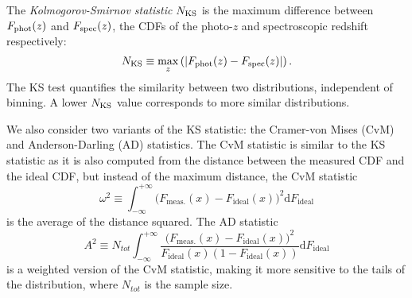 The \textit{Kolmogorov-Smirnov statistic} $N_{\rm KS}$ is the maximum difference between $F_{\rm phot}(z)$ and $F_{\rm spec}(z)$, the CDFs of the photo-$z$ and spectroscopic redshift respectively:
\begin{equation}
N_{\rm KS} \equiv \max_{z}\left( \left| F_{\rm phot}(z) - F_{\rm spec}(z) \right| \right).
\end{equation}
The KS test quantifies the similarity between two distributions, independent of binning.
A lower $N_{\rm KS}$ value corresponds to more similar distributions.

We also consider two variants of the KS statistic: the Cramer-von Mises (CvM) and Anderson-Darling (AD) statistics.
The CvM statistic is similar to the KS statistic as it is also computed from the distance between the measured CDF and the ideal CDF, but instead of the maximum distance, the CvM statistic
\begin{equation}
\label{eq:cvm}
\omega^2 \equiv \int_{-\infty}^{+\infty}\big(F_{\mathrm{meas.}}(x) - F_{\mathrm{ideal}}(x)\big)^2\mathrm{d}F_{\mathrm{ideal}}
\end{equation}
is the average of the distance squared.
The AD statistic
\begin{equation} \label{eq:ad}
A^2 \equiv N_{tot}\int_{-\infty}^{+\infty} \frac{\big(F_{\mathrm{meas.}}(x) - F_{\mathrm{ideal}}(x)\big)^2} {F_{\mathrm{ideal}}(x) (1-F_{\mathrm{ideal}}(x))}\mathrm{d}F_{\mathrm{ideal}}
\end{equation}
is a weighted version of the CvM statistic, making it more sensitive to the tails of the distribution, where $N_{tot}$ is the sample size.

